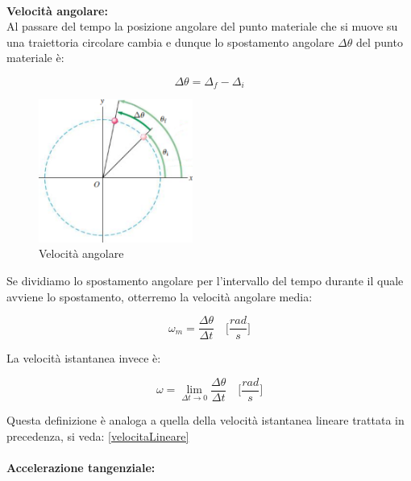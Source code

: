 \paragraph{}

\textbf{Velocità angolare:}\\

Al passare del tempo la posizione angolare del punto materiale che si muove su una traiettoria circolare cambia e dunque lo spostamento angolare $\Delta\theta$ del punto materiale è:

\begin{equation}
    \Delta\theta = \Delta_f - \Delta_i
\end{equation}

\begin{figure}
    \centering
    \includegraphics[width = 0.45\textwidth]{image/velocitaAng.png}
    \caption{Velocità angolare}
    \label{fig:velAng}
\end{figure}

Se dividiamo lo spostamento angolare per l’intervallo del tempo durante il quale avviene lo spostamento, otterremo la velocità angolare media:

\begin{equation}
    \omega_m = \frac{\Delta\theta}{\Delta t} \quad \biggl[\frac{rad}{s}\biggl]
\end{equation}

La velocità istantanea invece è: 

\begin{equation}
    \omega = \lim_{\Delta t \to 0} {\frac{\Delta\theta}{\Delta t}} \quad \biggl[\frac{rad}{s}\biggl]
\end{equation}

Questa definizione è analoga a quella della velocità istantanea lineare trattata in precedenza, si veda: \ref{velocitaLineare}

\paragraph{}
\textbf{Accelerazione tangenziale:}\\


